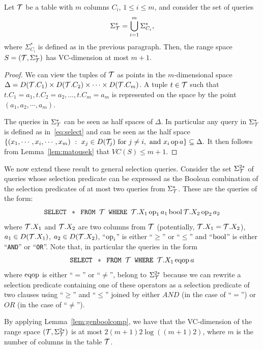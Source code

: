 \begin{lemma}\label{lem:vcdimselmulcol}
  Let ${\cal T}$ be a table with $m$ columns $C_i$, $1\le i\le m$, and consider the
  set of queries 
  \[\Sigma^*_{\cal T}=\bigcup_{i=1}^m \Sigma^*_{C_i},\]
  where
  $\Sigma^*_{C_i}$ is defined as in the previous paragraph. Then, the range
  space $S=({\cal T},\Sigma^*_{\cal T})$ has VC-dimension at most $m+1$.
\end{lemma}

\begin{proof}
  We can view the tuples of ${\cal T}$ as points in the $m$-dimensional space
  $\Delta=D({\cal T}.C_1)\times D({\cal T}.C_2) \times \cdots\times D({\cal T}.C_m)$. A tuple
  $t\in{\cal T}$ such that $t.C_1=a_1, t.C_2=a_2, \ldots, t.C_m=a_m$ is represented
  on the space by the point $(a_1,a_2,\cdots,a_m)$.

  The queries in $\Sigma^*_{\cal T}$ can be seen as half spaces of $\Delta$. In
  particular any query in $\Sigma^*_{\cal T}$ is defined as in~\eqref{eq:select}
  and can be seen as the half space $\{(x_1,\cdots,x_i,\cdots,x_m) ~:~ x_j\in
  D({\cal T}_j)\mbox{ for } j\neq i, \mbox{ and } x_i \operatorname{op} a\}\subseteq \Delta.$ It
  then follows from Lemma~\ref{lem:matousek} that $VC(S)\le m+1$.
\end{proof}

We now extend these result to general selection queries. Consider the set
$\Sigma^{2*}_{\cal T}$ of queries whose selection predicate can be expressed as the
Boolean combination of the selection predicates of at most two queries from
$\Sigma^*_{\cal T}$. These are the queries of the form:
\[
\mbox{\texttt{SELECT }} * \mbox{\texttt{ FROM }} {\cal T} \mbox{\texttt{ WHERE }}
{\cal T}.X_1 \operatorname{op}_1 a_1 \operatorname{bool} {\cal T}.X_2 \operatorname{op}_2 a_2
\]
where ${\cal T}.X_1$ and ${\cal T}.X_2$ are two columns from ${\cal T}$ (potentially,
${\cal T}.X_1={\cal T}.X_2$), $a_1\in D({\cal T}.X_1)$, $a_2\in D({\cal T}.X_2)$, ``$\operatorname{op}_i$'' is
either ``$\ge$'' or ``$\le$'' and ``$\operatorname{bool}$'' is either ``\texttt{AND}'' or
``\texttt{OR}''. Note that, in particular the queries in the form
\[
\mbox{\texttt{SELECT }} * \mbox{\texttt{ FROM }} {\cal T} \mbox{\texttt{ WHERE }} {\cal T}.X_1 \operatorname{eqop} a
\]
where $\operatorname{eqop}$ is either ``$=$'' or ``$\neq$'', belong to $\Sigma^{2*}_{\cal T}$
because we can rewrite a selection predicate containing one of these operators as
a selection predicate of two clauses using ``$\ge$'' and ``$\le$'' joined by
either $AND$ (in the case of ``$=$'') or $OR$ (in the case of ``$\neq$'').

By applying Lemma~\ref{lem:genboolcomp}, we have that the VC-dimension of the
range space $({\cal T},\Sigma^{2*}_{\cal T})$ is at most $2(m+1)2\log((m+1)2)$, where
$m$ is the number of columns in the table ${\cal T}$.

